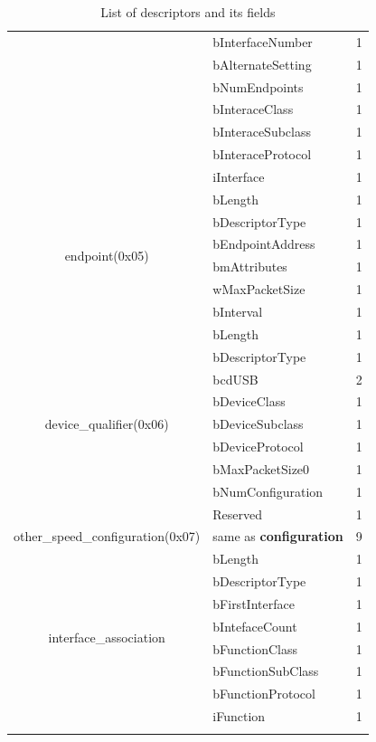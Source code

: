 \begin{longtable}{|c|l|c|}
      & bInterfaceNumber & 1 \\ \cline{2-3}
      & bAlternateSetting & 1 \\ \cline{2-3}
      & bNumEndpoints   & 1 \\ \cline{2-3}
      & bInteraceClass  & 1 \\ \cline{2-3}
      & bInteraceSubclass  & 1 \\ \cline{2-3}
      & bInteraceProtocol  & 1 \\ \cline{2-3}
      & iInterface  & 1 \\ \hline
    \multirow{6}{*}{endpoint(0x05)} & bLength & 1 \\ \cline{2-3}
      & bDescriptorType & 1 \\ \cline{2-3}
      & bEndpointAddress & 1 \\ \cline{2-3}
      & bmAttributes & 1 \\ \cline{2-3}
      & wMaxPacketSize   & 1 \\ \cline{2-3}
      & bInterval  & 1 \\ \hline
    \multirow{9}{*}{device\_qualifier(0x06)} & bLength & 1 \\ \cline{2-3}
      & bDescriptorType & 1 \\ \cline{2-3}
      & bcdUSB          & 2 \\ \cline{2-3}
      & bDeviceClass    & 1 \\ \cline{2-3}
      & bDeviceSubclass & 1 \\ \cline{2-3}
      & bDeviceProtocol & 1 \\ \cline{2-3}
      & bMaxPacketSize0 & 1 \\ \cline{2-3}
      & bNumConfiguration & 1 \\ \cline{2-3}
      & Reserved  & 1 \\ \hline
    other\_speed\_configuration(0x07) & same as \textbf{configuration} & 9 \\ \hline
    \multirow{8}{*}{interface\_association} & bLength & 1 \\ \cline{2-3}
      & bDescriptorType & 1 \\ \cline{2-3}
      & bFirstInterface & 1 \\ \cline{2-3}
      & bIntefaceCount  & 1 \\ \cline{2-3}
      & bFunctionClass  & 1 \\ \cline{2-3}
      & bFunctionSubClass & 1 \\ \cline{2-3}
      & bFunctionProtocol & 1 \\ \cline{2-3}
      & iFunction & 1 \\ \hline
\caption{List of descriptors and its fields}
\label{tab:list_descriptors}
\end{longtable}


